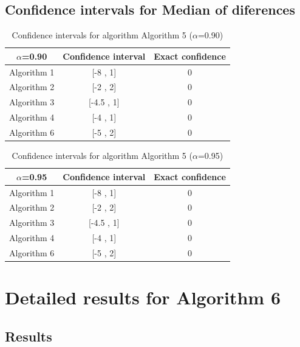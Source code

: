\documentclass[a4paper,10pt]{article}
\begin{document}
\subsection{Confidence intervals for Median of diferences}

\begin{table}[!htp]
\centering\small
\begin{tabular}{
|c|c|c|}
\hline
 $\alpha$=0.90 & Confidence interval & Exact confidence \\ \hline 
Algorithm 1 & [-8 , 1] & 0\\ \hline 
Algorithm 2 & [-2 , 2] & 0\\ \hline 
Algorithm 3 & [-4.5 , 1] & 0\\ \hline 
Algorithm 4 & [-4 , 1] & 0\\ \hline 
Algorithm 6 & [-5 , 2] & 0\\ \hline 

\end{tabular}
\caption{Confidence intervals for algorithm Algorithm 5 ($\alpha$=0.90)}
\end{table}
\begin{table}[!htp]
\centering\small
\begin{tabular}{
|c|c|c|}
\hline
 $\alpha$=0.95 & Confidence interval & Exact confidence \\ \hline 
Algorithm 1 & [-8 , 1] & 0\\ \hline 
Algorithm 2 & [-2 , 2] & 0\\ \hline 
Algorithm 3 & [-4.5 , 1] & 0\\ \hline 
Algorithm 4 & [-4 , 1] & 0\\ \hline 
Algorithm 6 & [-5 , 2] & 0\\ \hline 

\end{tabular}
\caption{Confidence intervals for algorithm Algorithm 5 ($\alpha$=0.95)}
\end{table}

 \clearpage 


\section{Detailed results for Algorithm 6}


\subsection{Results}
\end{document}
